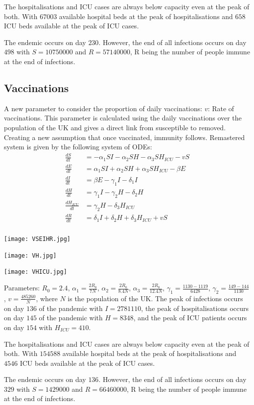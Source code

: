 \documentclass[11pt]{article}
\begin{document}
The hospitalisations and ICU cases are always below capacity even at the peak of both. With $67003$ available hospital beds at the peak of hospitalisations and $658$ ICU beds available at the peak of ICU cases. \par
The endemic occurs on day $230$. However, the end of all infections occurs on day $498$ with $S=10750000$ and $R=57140000$, R being the number of people immune at the end of infections.
\subsection{Vaccinations}
A new parameter to consider the proportion of daily vaccinations:
\newline $v$: Rate of vaccinations.
\newline This parameter is calculated using the daily vaccinations over the population of the UK and gives a direct link from susceptible to removed. Creating a new assumption that once vaccinated, immunity follows. Remastered system is given by the following system of ODEs:
\begin{equation}
\begin{aligned}
\frac{dS}{dt}&=- \alpha_1 SI - \alpha_2 SH - \alpha_3 SH_{ICU} - v S \\
\frac{dE}{dt}&= \alpha_1 SI + \alpha_2 SH + \alpha_3 SH_{ICU} - \beta E \\
\frac{dI}{dt}&= \beta E -\gamma_1 I -\delta_1 I \\
\frac{dH}{dt}&= \gamma_1 I - \gamma_2 H -\delta_2 H \\
\frac{dH_{ICU}}{dt}&= \gamma_2 H -\delta_3 H_{ICU} \\
\frac{dR}{dt}&=\delta_1 I + \delta_2 H + \delta_3 H_{ICU} + v S \\
\end{aligned}
\end{equation} 
\begin{center}
\texttt{[image: VSEIHR.jpg]} 

\texttt{[image: VH.jpg]} 

\texttt{[image: VHICU.jpg]} 
\end{center}
Parameters: $R_0=2.4$, $\alpha_1=\frac{2R_0}{7N}$, $\alpha_2=\frac{2R_0}{8.4N}$, $\alpha_3=\frac{2R_0}{12.4N}$, $\gamma_1=\frac{1130-1119}{6428}$, $\gamma_2=\frac{149-144}{1130}$, $v=\frac{485260}{N}$, where $N$ is the population of the UK. The peak of infections occurs on day $136$ of the pandemic with $I=2781110$, the peak of hospitalisations occurs on day $145$ of the pandemic with $H=8348$, and the peak of ICU patients occurs on day $154$ with $H_{ICU}=410$. \par 
The hospitalisations and ICU cases are always below capacity even at the peak of both. With $154588$ available hospital beds at the peak of hospitalisations and $4546$ ICU beds available at the peak of ICU cases. \par
The endemic occurs on day $136$. However, the end of all infections occurs on day $329$ with $S=1429000$ and $R=66460000$, R being the number of people immune at the end of infections.
\end{document}
